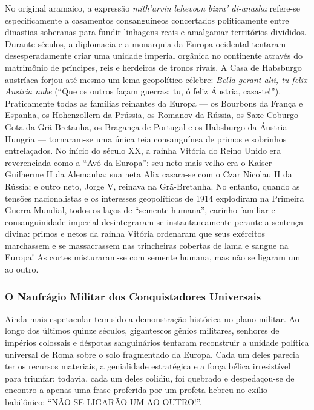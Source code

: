 \documentclass[11pt,a4paper,openany]{book}
\begin{document}
No original aramaico, a expressão \textit{mith'arvin lehevoon bizra' di-anasha} refere-se especificamente a casamentos consanguíneos concertados politicamente entre dinastias soberanas para fundir linhagens reais e amalgamar territórios divididos.
Durante séculos, a diplomacia e a monarquia da Europa ocidental tentaram desesperadamente criar uma unidade imperial orgânica no continente através do matrimônio de príncipes, reis e herdeiros de tronos rivais.
A Casa de Habsburgo austríaca forjou até mesmo um lema geopolítico célebre: \textit{Bella gerant alii, tu felix Austria nube} (``Que os outros façam guerras; tu, ó feliz Áustria, casa-te!''). Praticamente todas as famílias reinantes da Europa — os Bourbons da França e Espanha, os Hohenzollern da Prússia, os Romanov da Rússia, os Saxe-Coburgo-Gota da Grã-Bretanha, os Bragança de Portugal e os Habsburgo da Áustria-Hungria — tornaram-se uma única teia consanguínea de primos e sobrinhos entrelaçados.
No início do século XX, a rainha Vitória do Reino Unido era reverenciada como a ``Avó da Europa'': seu neto mais velho era o Kaiser Guilherme II da Alemanha; sua neta Alix casara-se com o Czar Nicolau II da Rússia; e outro neto, Jorge V, reinava na Grã-Bretanha. No entanto, quando as tensões nacionalistas e os interesses geopolíticos de 1914 explodiram na Primeira Guerra Mundial, todos os laços de ``semente humana'', carinho familiar e consanguinidade imperial desintegraram-se instantaneamente perante a sentença divina: primos e netos da rainha Vitória ordenaram que seus exércitos marchassem e se massacrassem nas trincheiras cobertas de lama e sangue na Europa! As cortes misturaram-se com semente humana, mas não se ligaram um ao outro.


\subsubsection*{O Naufrágio Militar dos Conquistadores Universais}
Ainda mais espetacular tem sido a demonstração histórica no plano militar. Ao longo dos últimos quinze séculos, gigantescos gênios militares, senhores de impérios colossais e déspotas sanguinários tentaram reconstruir a unidade política universal de Roma sobre o solo fragmentado da Europa. Cada um deles parecia ter os recursos materiais, a genialidade estratégica e a força bélica irresistível para triunfar; todavia, cada um deles colidiu, foi quebrado e despedaçou-se de encontro a apenas uma frase proferida por um profeta hebreu no exílio babilônico: ``NÃO SE LIGARÃO UM AO OUTRO!''.
\end{document}

